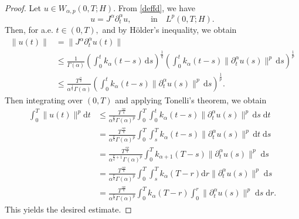 \documentclass[reqno]{amsart}
\numberwithin{equation}{section}
\def \d {\mathrm{d}}
\begin{document}
\begin{proof}
    Let $u\in W_{\alpha,p}(0,T;H)$. From \eqref{deffd}, we have
	\begin{equation*}
	u=J^\alpha \partial_t^\alpha u,\qquad \mbox{ in} \quad L^p(0,T;H).
	\end{equation*}
	Then, for a.e. $t\in (0,T),$ and by H\"older's inequality, we obtain
	\begin{align*}
		\|u(t)\|&= \|J^\alpha \partial_t^\alpha u (t)\|\\
		&\le \frac{1}{\Gamma(\alpha)} \left(\int^t_0 k_\alpha(t-s)
		\, \d s \right)^{\frac{1}{q}} \left(\int^t_0 k_\alpha(t-s)
		\|\partial_t^\alpha u(s)\|^p\, \d s \right)^{\frac{1}{p}}\\
		&\le \frac{T^{\frac{\alpha}{q}}}{\alpha^{\frac{1}{q}}\Gamma(\alpha)}\left(\int^t_0 k_\alpha(t-s)
		\|\partial_t^\alpha u(s)\|^p\, \d s \right)^{\frac{1}{p}}.
	\end{align*}
	Then integrating over $(0,T)$ and applying Tonelli’s theorem, we obtain 
    \begin{align*}
        \int_0^T \|u(t)\|^p\d t
		&\le \frac{T^{\frac{\alpha p}{q}}}{\alpha^{\frac{p}{q}}\Gamma(\alpha)^p}\int_0^T\int^t_0 k_\alpha(t-s)
		\|\partial_t^\alpha u(s)\|^p\, \d s\;\d t\\
        &= \frac{T^{\frac{\alpha p}{q}}}{\alpha^{\frac{p}{q}}\Gamma(\alpha)^p}\int^T_0\int_s^T k_\alpha(t-s)
		\|\partial_t^\alpha u(s)\|^p\, \d t\;\d s\\
        &=\frac{T^{\frac{\alpha p}{q}}}{\alpha^{\frac{p}{q}+1}\Gamma(\alpha)^p}\int^T_0 k_{\alpha+1}(T-s)
		\|\partial_t^\alpha u(s)\|^p\;\d s \\
        &=\frac{T^{\frac{\alpha p}{q}}}{\alpha^{\frac{p}{q}}\Gamma(\alpha)^p}\int^T_0\int_s^T k_{\alpha}(T-r)\d r
		\|\partial_t^\alpha u(s)\|^p\;\d s\\
        &= \frac{T^{\frac{\alpha p}{q}}}{\alpha^{\frac{p}{q}}\Gamma(\alpha)^p}\int^T_0 k_{\alpha}(T-r)
		\int_0^r\|\partial_t^\alpha u(s)\|^p\;\d s\;\d r.
    \end{align*}
    This yields the desired estimate.
\end{proof}
\end{document}
